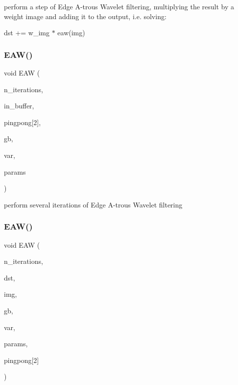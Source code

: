 perform a step of Edge A-\/trous Wavelet filtering, multiplying the result by a weight image and adding it to the output, i.\+e. solving\+:

dst += w\+\_\+img $\ast$ eaw(img) \mbox{\label{group___filtering_module_gaf515a6c5c5019b5647219ad6566323e1}} 
\subsubsection{\texorpdfstring{E\+A\+W()}{EAW()}\hspace{0.1cm}{\footnotesize\ttfamily [3/5]}}
{\footnotesize\ttfamily void E\+AW (\begin{DoxyParamCaption}\item[{const uint32}]{n\+\_\+iterations,  }\item[{uint32 \&}]{in\+\_\+buffer,  }\item[{\hyperlink{struct_f_buffer_channel_view}{F\+Buffer\+Channel\+View}}]{pingpong\mbox{[}2\mbox{]},  }\item[{const \hyperlink{struct_g_buffer_view}{G\+Buffer\+View}}]{gb,  }\item[{const float $\ast$}]{var,  }\item[{const \hyperlink{struct_e_a_w_params}{E\+A\+W\+Params}}]{params }\end{DoxyParamCaption})}

perform several iterations of Edge A-\/trous Wavelet filtering \mbox{\label{group___filtering_module_ga55750da8e47a4f02c52581780d82b7be}} 
\subsubsection{\texorpdfstring{E\+A\+W()}{EAW()}\hspace{0.1cm}{\footnotesize\ttfamily [4/5]}}
{\footnotesize\ttfamily void E\+AW (\begin{DoxyParamCaption}\item[{const uint32}]{n\+\_\+iterations,  }\item[{\hyperlink{struct_f_buffer_channel_view}{F\+Buffer\+Channel\+View}}]{dst,  }\item[{const \hyperlink{struct_f_buffer_channel_view}{F\+Buffer\+Channel\+View}}]{img,  }\item[{const \hyperlink{struct_g_buffer_view}{G\+Buffer\+View}}]{gb,  }\item[{const float $\ast$}]{var,  }\item[{const \hyperlink{struct_e_a_w_params}{E\+A\+W\+Params}}]{params,  }\item[{\hyperlink{struct_f_buffer_channel_view}{F\+Buffer\+Channel\+View}}]{pingpong\mbox{[}2\mbox{]} }\end{DoxyParamCaption})}

